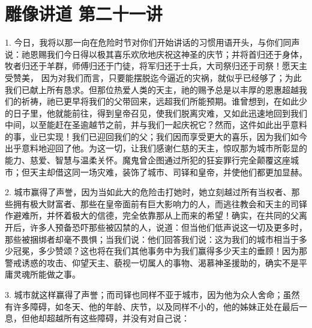 
\section{雕像讲道 第二十一讲}

\par

1. 今日，我将以那一向在危险时节对你们开始讲话的习惯用语开头，与你们同声说：祂恩赐我们今日得以极其喜乐欢欣地庆祝这神圣的庆节；并将首归还于身体，牧者归还于羊群，师傅归还于门徒，将军归还于士兵，大司祭归还于司祭！愿天主受赞美， 因为对我们而言，只要能摆脱迄今逼近的灾祸，就似乎已经够了；为此我们已献上所有恳求。但那位热爱人类的天主，祂的赐予总是以丰厚的恩惠超越我们的祈祷，祂已更早将我们的父带回来，远超我们所能预期。谁曾想到，在如此少的日子里，他就能前往，得到皇帝召见，使我们脱离灾难，又如此迅速地回到我们中间，以至能赶在圣逾越节之前，并与我们一起庆祝它？然而，这件如此出乎意料的事，业已实现！我们已迎回我们的父；我们因而享受更大的喜乐，因为我们如今出乎意料地迎回了他。为这一切，让我们感谢仁慈的天主，惊叹那为城市所彰显的能力、慈爱、智慧与温柔关怀。魔鬼曾企图通过所犯的狂妄罪行完全颠覆这座城市；但天主却借这同一场灾难，装饰了城市、司铎和皇帝，并使他们都更加显赫。\par

2. 城市赢得了声誉，因为当如此大的危险击打她时，她立刻越过所有当权者、那些拥有极大财富者、那些在皇帝面前有巨大影响力的人，而逃往教会和天主的司铎作避难所，并怀着极大的信德，完全依靠那从上而来的希望！确实，在共同的父离开后，许多人预备恐吓那些被囚禁的人，说道：但当他们低声说这一切及更多时，那些被捆绑者却毫不畏惧；当我们说：他们回答我们说：这为我们的城市相当于多少冠冕，多少赞颂？这也将在我们其他事务中为我们赢得多少天主的垂顾！因为那警戒诱惑的攻击、仰望天主、藐视一切属人的事物、渴慕神圣援助的，确实不是平庸灵魂所能做之事。\par

3. 城市就这样赢得了声誉；而司铎也同样不亚于城市，因为他为众人舍命；虽然有许多障碍，如冬天、他的年龄、庆节，以及同样不小的，他的姊妹正处在最后一息，但他却超越所有这些障碍，并没有对自己说：\par

